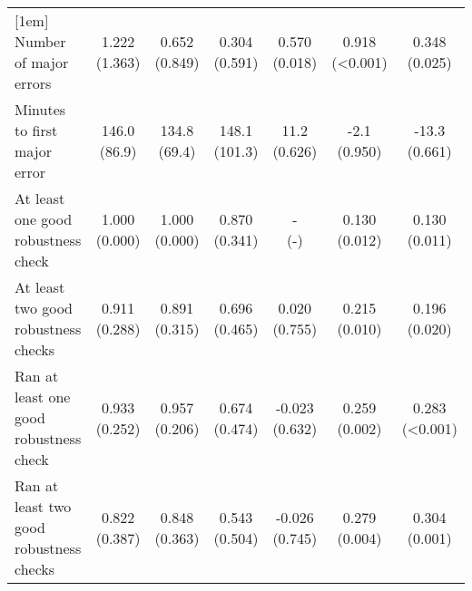 \begin{table}[ht]
{\begin{tabular}{lcccccc}
[1em]
Number of major errors & \shortstack{1.222\\(1.363)} & \shortstack{0.652\\(0.849)} & \shortstack{0.304\\(0.591)} & \shortstack{0.570\\(0.018)} & \shortstack{0.918\\(\textless0.001)} & \shortstack{0.348\\(0.025)}\\
[1em]
Minutes to first major error & \shortstack{146.0\\(86.9)} & \shortstack{134.8\\(69.4)} & \shortstack{148.1\\(101.3)} & \shortstack{11.2\\(0.626)} & \shortstack{-2.1\\(0.950)} & \shortstack{-13.3\\(0.661)}\\
[1em]
At least one good robustness check & \shortstack{1.000\\(0.000)} & \shortstack{1.000\\(0.000)} & \shortstack{0.870\\(0.341)} & \shortstack{-\\(-)} & \shortstack{0.130\\(0.012)} & \shortstack{0.130\\(0.011)}\\
[1em]
At least two good robustness checks & \shortstack{0.911\\(0.288)} & \shortstack{0.891\\(0.315)} & \shortstack{0.696\\(0.465)} & \shortstack{0.020\\(0.755)} & \shortstack{0.215\\(0.010)} & \shortstack{0.196\\(0.020)}\\
[1em]
Ran at least one good robustness check & \shortstack{0.933\\(0.252)} & \shortstack{0.957\\(0.206)} & \shortstack{0.674\\(0.474)} & \shortstack{-0.023\\(0.632)} & \shortstack{0.259\\(0.002)} & \shortstack{0.283\\(\textless0.001)}\\
[1em]
Ran at least two good robustness checks & \shortstack{0.822\\(0.387)} & \shortstack{0.848\\(0.363)} & \shortstack{0.543\\(0.504)} & \shortstack{-0.026\\(0.745)} & \shortstack{0.279\\(0.004)} & \shortstack{0.304\\(0.001)}\\

\end{tabular}}
\end{table}
